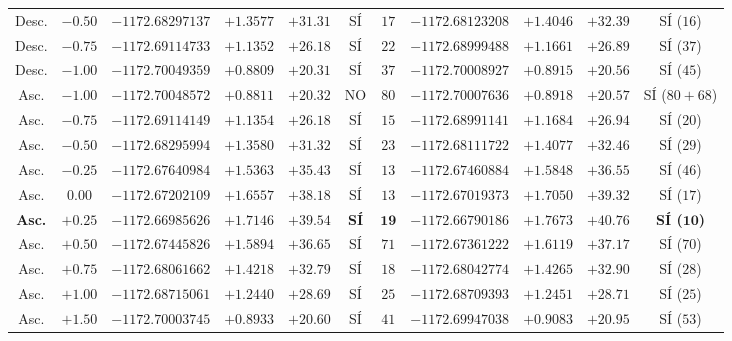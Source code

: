 \documentclass[10pt,twocolumn,a4paper]{article}
\begin{document}
\begin{table}[t]
{\begin{tabular}{@{}cc|ccccc|cccc@{}}
Desc. & $-0.50$ & $-1172.68297137$ & $+1.3577$ & $+31.31$ & SÍ & $17$ & $-1172.68123208$ & $+1.4046$ & $+32.39$ & SÍ ($16$) \\
Desc. & $-0.75$ & $-1172.69114733$ & $+1.1352$ & $+26.18$ & SÍ & $22$ & $-1172.68999488$ & $+1.1661$ & $+26.89$ & SÍ ($37$) \\
Desc. & $-1.00$ & $-1172.70049359$ & $+0.8809$ & $+20.31$ & SÍ & $37$ & $-1172.70008927$ & $+0.8915$ & $+20.56$ & SÍ ($45$) \\ \midrule
Asc. & $-1.00$ & $-1172.70048572$ & $+0.8811$ & $+20.32$ & NO & $80$ & $-1172.70007636$ & $+0.8918$ & $+20.57$ & SÍ ($80+68$) \\
Asc. & $-0.75$ & $-1172.69114149$ & $+1.1354$ & $+26.18$ & SÍ & $15$ & $-1172.68991141$ & $+1.1684$ & $+26.94$ & SÍ ($20$) \\
Asc. & $-0.50$ & $-1172.68295994$ & $+1.3580$ & $+31.32$ & SÍ & $23$ & $-1172.68111722$ & $+1.4077$ & $+32.46$ & SÍ ($29$) \\
Asc. & $-0.25$ & $-1172.67640984$ & $+1.5363$ & $+35.43$ & SÍ & $13$ & $-1172.67460884$ & $+1.5848$ & $+36.55$ & SÍ ($46$) \\
Asc. & $0.00$ & $-1172.67202109$ & $+1.6557$ & $+38.18$ & SÍ & $13$ & $-1172.67019373$ & $+1.7050$ & $+39.32$ & SÍ ($17$) \\
\textbf{Asc.} & $\mathbf{+0.25}$ & $\mathbf{-1172.66985626}$ & $\mathbf{+1.7146}$ & $\mathbf{+39.54}$ & \textbf{SÍ} & $\mathbf{19}$ & $\mathbf{-1172.66790186}$ & $\mathbf{+1.7673}$ & $\mathbf{+40.76}$ & \textbf{SÍ ($\mathbf{10}$)} \\
Asc. & $+0.50$ & $-1172.67445826$ & $+1.5894$ & $+36.65$ & SÍ & $71$ & $-1172.67361222$ & $+1.6119$ & $+37.17$ & SÍ ($70$) \\
Asc. & $+0.75$ & $-1172.68061662$ & $+1.4218$ & $+32.79$ & SÍ & $18$ & $-1172.68042774$ & $+1.4265$ & $+32.90$ & SÍ ($28$) \\
Asc. & $+1.00$ & $-1172.68715061$ & $+1.2440$ & $+28.69$ & SÍ & $25$ & $-1172.68709393$ & $+1.2451$ & $+28.71$ & SÍ ($25$) \\
Asc. & $+1.50$ & $-1172.70003745$ & $+0.8933$ & $+20.60$ & SÍ & $41$ & $-1172.69947038$ & $+0.9083$ & $+20.95$ & SÍ ($53$) \\ \bottomrule
\end{tabular}%
}
\end{table}
\end{document}
